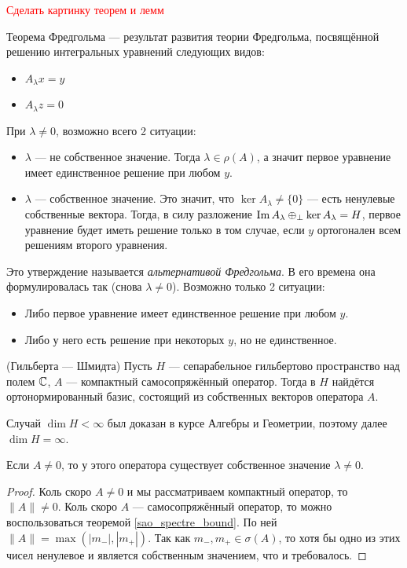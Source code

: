 \textcolor{red}{Сделать картинку теорем и лемм}

\begin{note}
	Теорема Фредгольма --- результат развития теории Фредгольма, посвящённой решению интегральных уравнений следующих видов:
	\begin{itemize}
		\item $A_\lambda x = y$
		
		\item $A_\lambda z = 0$
	\end{itemize}
	При $\lambda \neq 0$, возможно всего 2 ситуации:
	\begin{itemize}
		\item $\lambda$ --- не собственное значение. Тогда $\lambda \in \rho(A)$, а значит первое уравнение имеет единственное решение при любом $y$.
		
		\item $\lambda$ --- собственное значение. Это значит, что $\ker A_\lambda \neq \{0\}$ --- есть ненулевые собственные вектора. Тогда, в силу разложение $\operatorname{Im} A_\lambda \oplus_\bot \ker A_\lambda = H$, первое уравнение будет иметь решение только в том случае, если $y$ ортогонален всем решениям второго уравнения.
	\end{itemize}
	Это утверждение называется \textit{альтернативой Фредгольма}. В его времена она формулировалась так (снова $\lambda \neq 0$). Возможно только 2 ситуации:
	\begin{itemize}
		\item Либо первое уравнение имеет единственное решение при любом $y$.
		
		\item Либо у него есть решение при некоторых $y$, но не единственное.
	\end{itemize}
\end{note}

\begin{theorem} (Гильберта --- Шмидта)
	Пусть $H$ --- сепарабельное гильбертово пространство над полем $\mathbb{C}$, $A$ --- компактный самосопряжённый оператор. Тогда в $H$ найдётся ортонормированный базис, состоящий из собственных векторов оператора $A$.
\end{theorem}

\begin{note}
	Случай $\dim H < \infty$ был доказан в курсе Алгебры и Геометрии, поэтому далее $\dim H = \infty$.
\end{note}

\begin{lemma}
	Если $A \neq 0$, то у этого оператора существует собственное значение $\lambda \neq 0$.
\end{lemma}

\begin{proof}
	Коль скоро $A \neq 0$ и мы рассматриваем компактный оператор, то $\|A\| \neq 0$. Коль скоро $A$ --- самосопряжённый оператор, то можно воспользоваться теоремой \ref{sao_spectre_bound}. По ней $\|A\| = \max(|m_-|, |m_+|)$. Так как $m_-, m_+ \in \sigma(A)$, то хотя бы одно из этих чисел ненулевое и является собственным значением, что и требовалось.
\end{proof}